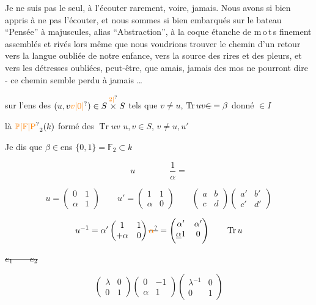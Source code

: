 Je ne suis pas le seul, à l'écouter rarement, voire, jamais. Nous avons si bien appris à ne pas l'écouter, et nous sommes si bien embarqués sur le bateau ``Pensée'' à majuscules, alias ``Abstraction'', à la coque étanche de \mbox{m\,o\,t\,s} finement assemblés et rivés \handwritten{!}  lors même que nous voudrions trouver le chemin d'un retour vers la langue oubliée de notre enfance, vers la source des rires et des pleurs, et vers les détresses oubliées, peut-être, que amais, jamais des mos ne pourront dire -  ce chemin semble perdu à jamais \ldots

sur l'ens des $(u,v\unsure{v|0|{} })\in S\overset{\unsure{2|{}}}{\times}S$ tels que $v\ne u$, $\operatorname{Tr}uv\deleted{\in}=\beta$ donné $\in I$

là  $\unsure{\mathbb P|\mathbb F|\mathrm P}_2(k)$  formé des $\operatorname{Tr}uv$  $u,v\in S$, $v\ne u,u'$

Je dis que $\beta\in$\qquad ens  $\{0,1\}=\mathbb F_2\subset k$

\[
u\qquad\qquad \frac{1}{\alpha}=
\]

\[
u=\begin{pmatrix}0&1\\\alpha&1\end{pmatrix}\qquad
u'=\begin{pmatrix}1&1\\\alpha&0\end{pmatrix}
\qquad
\begin{pmatrix}a&b\\c&d\end{pmatrix}\begin{pmatrix}a'&b'\\c'&d'\end{pmatrix}
\]

\[
u^{-1}=\alpha'\begin{pmatrix}1&1\\+\alpha&0\end{pmatrix}\deleted{\unsure{\alpha}}
=\begin{pmatrix}\alpha'&\alpha'\\\deleted{\alpha}1&0\end{pmatrix}\qquad\operatorname{Tr}u
\]

$\deleted{e_1\qquad e_2}$

\[
\begin{pmatrix}\lambda&0\\0&1\end{pmatrix}
\begin{pmatrix}0&-1\\\alpha&1\end{pmatrix}
\begin{pmatrix}\lambda^{-1}&0\\0&1\end{pmatrix}
\]

